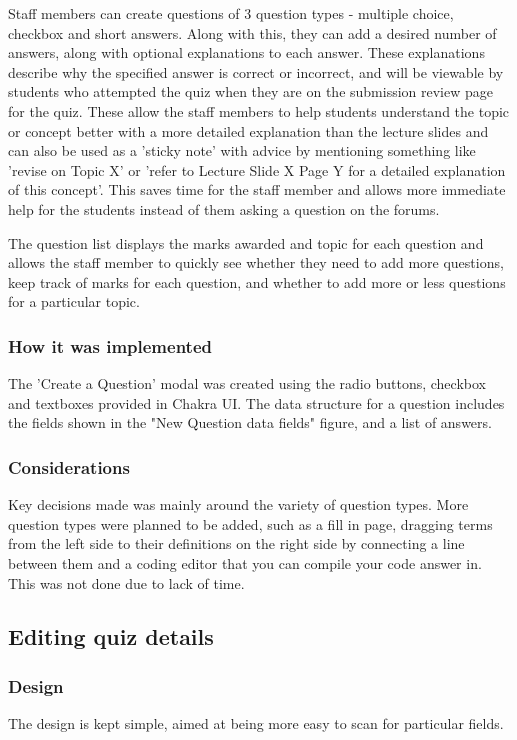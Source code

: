 Staff members can create questions of 3 question types - multiple choice, checkbox and short answers. Along with this, they can add a desired number of answers, along with optional explanations to each answer. These explanations describe why the specified answer is correct or incorrect, and will be viewable by students who attempted the quiz when they are on the submission review page for the quiz. These allow the staff members to help students understand the topic or concept better with a more detailed explanation than the lecture slides and can also be used as a 'sticky note' with advice by mentioning something like 'revise on Topic X' or 'refer to Lecture Slide X Page Y for a detailed explanation of this concept'. This saves time for the staff member and allows more immediate help for the students instead of them asking a question on the forums.

The question list displays the marks awarded and topic for each question and allows the staff member to quickly see whether they need to add more questions, keep track of marks for each question, and whether to add more or less questions for a particular topic. 

\subsubsection{How it was implemented}
The 'Create a Question' modal was created using the radio buttons, checkbox and textboxes provided in Chakra UI. The data structure for a question includes the fields shown in the "New Question data fields" figure, and a list of answers. 

\subsubsection{Considerations}
Key decisions made was mainly around the variety of question types. More question types were planned to be added, such as a fill in page, dragging terms from the left side to their definitions on the right side by connecting a line between them and a coding editor that you can compile your code answer in. This was not done due to lack of time.

\subsection{Editing quiz details}

\subsubsection{Design}
The design is kept simple, aimed at being more easy to scan for particular fields. 

